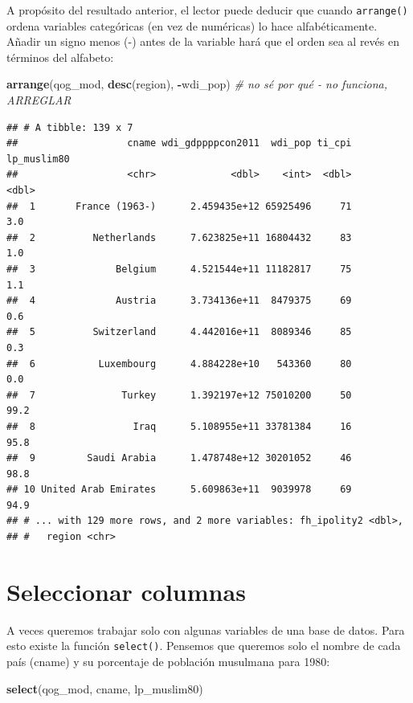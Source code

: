 \documentclass[]{book}
\newenvironment{Shaded}{\begin{snugshade}}{\end{snugshade}}
\newcommand{\KeywordTok}[1]{\textcolor[rgb]{0.13,0.29,0.53}{\textbf{#1}}}
\newcommand{\CommentTok}[1]{\textcolor[rgb]{0.56,0.35,0.01}{\textit{#1}}}
\newcommand{\OperatorTok}[1]{\textcolor[rgb]{0.81,0.36,0.00}{\textbf{#1}}}
\newcommand{\NormalTok}[1]{#1}
\begin{document}
A propósito del resultado anterior, el lector puede deducir que cuando
\texttt{arrange()} ordena variables categóricas (en vez de numéricas) lo
hace alfabéticamente. Añadir un signo menos (-) antes de la variable
hará que el orden sea al revés en términos del alfabeto:

\begin{Shaded}
\begin{Highlighting}[]
\KeywordTok{arrange}\NormalTok{(qog_mod, }\KeywordTok{desc}\NormalTok{(region), }\OperatorTok{-}\NormalTok{wdi_pop) }\CommentTok{# no sé por qué - no funciona, ARREGLAR}
\end{Highlighting}
\end{Shaded}

\begin{verbatim}
## # A tibble: 139 x 7
##                   cname wdi_gdppppcon2011  wdi_pop ti_cpi lp_muslim80
##                   <chr>             <dbl>    <int>  <dbl>       <dbl>
##  1       France (1963-)      2.459435e+12 65925496     71         3.0
##  2          Netherlands      7.623825e+11 16804432     83         1.0
##  3              Belgium      4.521544e+11 11182817     75         1.1
##  4              Austria      3.734136e+11  8479375     69         0.6
##  5          Switzerland      4.442016e+11  8089346     85         0.3
##  6           Luxembourg      4.884228e+10   543360     80         0.0
##  7               Turkey      1.392197e+12 75010200     50        99.2
##  8                 Iraq      5.108955e+11 33781384     16        95.8
##  9         Saudi Arabia      1.478748e+12 30201052     46        98.8
## 10 United Arab Emirates      5.609863e+11  9039978     69        94.9
## # ... with 129 more rows, and 2 more variables: fh_ipolity2 <dbl>,
## #   region <chr>
\end{verbatim}

\section{Seleccionar columnas}\label{seleccionar-columnas}

A veces queremos trabajar solo con algunas variables de una base de
datos. Para esto existe la función \texttt{select()}. Pensemos que
queremos solo el nombre de cada país (cname) y su porcentaje de
población musulmana para 1980:

\begin{Shaded}
\begin{Highlighting}[]
\KeywordTok{select}\NormalTok{(qog_mod, cname, lp_muslim80)}
\end{Highlighting}
\end{Shaded}
\end{document}
